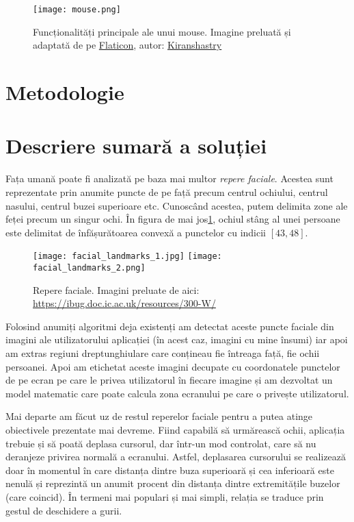 \begin{figure}[h]
    \centering
    \texttt{[image: mouse.png]}
    \caption{Funcționalități principale ale unui mouse. Imagine preluată și adaptată de pe \href{https://www.flaticon.com}{Flaticon}, autor: \href{https://www.flaticon.com/authors/kiranshastry}{Kiranshastry}}
\end{figure}

\section*{Metodologie}

\section*{Descriere sumară a soluției}

Fața umană poate fi analizată pe baza mai multor \emph{repere faciale}.
Acestea sunt reprezentate prin anumite puncte de pe față precum centrul ochiului, centrul nasului, centrul buzei superioare etc.
Cunoscând acestea, putem delimita zone ale feței precum un singur ochi.
În figura de mai jos\ref{figure:facial-landmarks}, ochiul stâng al unei persoane este delimitat de înfășurătoarea convexă a punctelor cu indicii $[43, 48]$.

\begin{figure}[h]
    \centering
    \texttt{[image: facial\_landmarks\_1.jpg]}
    \texttt{[image: facial\_landmarks\_2.png]}
    \caption{Repere faciale. Imagini preluate de aici: \url{https://ibug.doc.ic.ac.uk/resources/300-W/}}
    \label{figure:facial-landmarks}
\end{figure}

Folosind anumiți algoritmi deja existenți am detectat aceste puncte faciale din imagini ale utilizatorului aplicației (în acest caz, imagini cu mine însumi) iar apoi am extras regiuni dreptunghiulare care conțineau fie întreaga față, fie ochii persoanei.
Apoi am etichetat aceste imagini decupate cu coordonatele punctelor de pe ecran pe care le privea utilizatorul în fiecare imagine și am dezvoltat un model matematic care poate calcula zona ecranului pe care o privește utilizatorul.

Mai departe am făcut uz de restul reperelor faciale pentru a putea atinge obiectivele prezentate mai devreme.
Fiind capabilă să urmărească ochii, aplicația trebuie și să poată deplasa cursorul, dar într-un mod controlat, care să nu deranjeze privirea normală a ecranului.
Astfel, deplasarea cursorului se realizează doar în momentul în care distanța dintre buza superioară și cea inferioară este nenulă și reprezintă un anumit procent din distanța dintre extremitățile buzelor (care coincid).
În termeni mai populari și mai simpli, relația se traduce prin gestul de deschidere a gurii.

